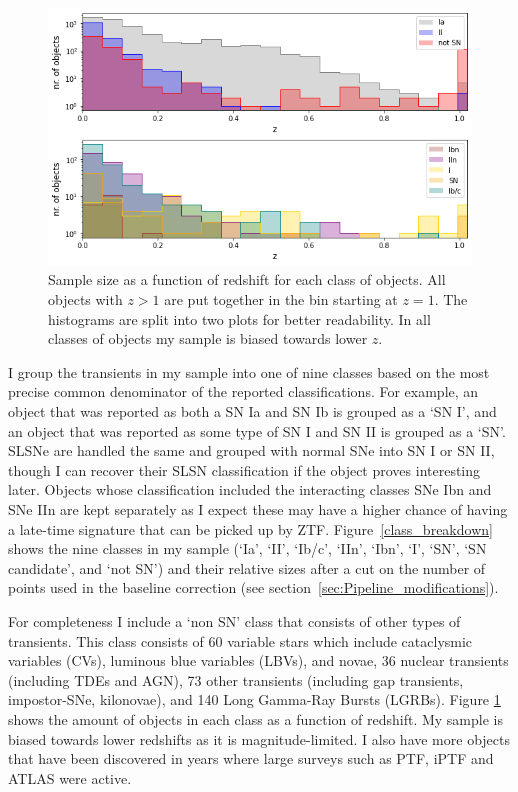 \documentclass[a4paper,oneside,12pt, class=Latex/Classes/PhDthesisPSnPDF, crop=false]{standalone}
\begin{document}
\begin{figure}
    \centering
    \includegraphics[width=\textwidth]{../Images/chapter_4/sample_hists_vert.png}
    \caption[Sample size as a function of redshift for all classes.]{Sample size as a function of redshift for each class of objects. All objects with $z>1$ are put together in the bin starting at $z=1$. The histograms are split into two plots for better readability. In all classes of objects my sample is biased towards lower $z$.}
    \label{class_hists}
\end{figure}

I group the transients in my sample into one of nine classes based on the most precise common denominator of the reported classifications. For example, an object that was reported as both a SN Ia and SN Ib is grouped as a `SN I', and an object that was reported as some type of SN I and SN II is grouped as a `SN'. SLSNe are handled the same and grouped with normal SNe into SN I or SN II, though I can recover their SLSN classification if the object proves interesting later. Objects whose classification included the interacting classes SNe Ibn and SNe IIn are kept separately as I expect these may have a higher chance of having a late-time signature that can be picked up by ZTF. Figure~\ref{class_breakdown} shows the nine classes in my sample (`Ia', `II', `Ib/c', `IIn', `Ibn', `I', `SN', `SN candidate', and `not SN') and their relative sizes after a cut on the number of points used in the baseline correction (see section~\ref{sec:Pipeline_modifications}).

For completeness I include a `non SN' class that consists of other types of transients. This class consists of 60 variable stars which include cataclysmic variables (CVs), luminous blue variables (LBVs), and novae, 36 nuclear transients (including TDEs and AGN), 73 other transients (including gap transients, impostor-SNe, kilonovae), and 140 Long Gamma-Ray Bursts (LGRBs).
Figure \ref{class_hists} shows the amount of objects in each class as a function of redshift. My sample is biased towards lower redshifts as it is magnitude-limited. I also have more objects that have been discovered in years where large surveys such as PTF, iPTF and ATLAS were active.
\end{document}
